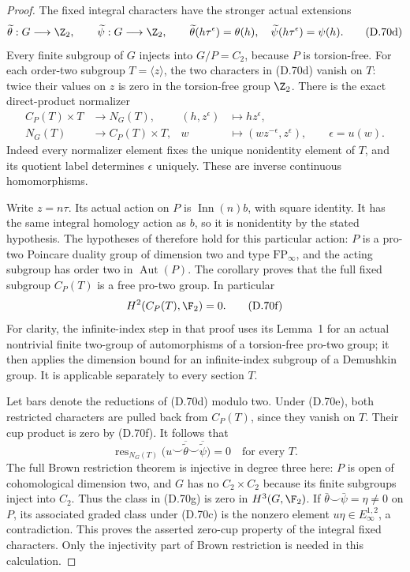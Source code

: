 \begin{proof}
The fixed integral characters have the stronger actual
extensions
\[
 \widetilde\theta:G\longrightarrow\Z_2,\qquad
 \widetilde\psi:G\longrightarrow\Z_2,\qquad
 \widetilde\theta(h\tau^\epsilon)=\theta(h),\quad
 \widetilde\psi(h\tau^\epsilon)=\psi(h).
                                                               \tag{D.70d}
\]
Every finite subgroup of $G$ injects into $G/P=C_2$,
because $P$ is torsion-free. For each order-two
subgroup $T=\langle z\rangle$, the two characters
in (D.70d) vanish on $T$: twice their values on
$z$ is zero in the torsion-free group $\Z_2$.
There is the exact direct-product normalizer
\[
 \begin{aligned}
 C_P(T)\times T&\longrightarrow N_G(T),
                    &(h,z^\epsilon)&\longmapsto hz^\epsilon,\\
 N_G(T)&\longrightarrow C_P(T)\times T,
                    &w&\longmapsto(wz^{-\epsilon},z^\epsilon),
                    \qquad \epsilon=u(w).
 \end{aligned}                                                \tag{D.70e}
\]
Indeed every normalizer element fixes the unique
nonidentity element of $T$, and its quotient label
determines $\epsilon$ uniquely.
These are inverse continuous homomorphisms.

Write $z=n\tau$. Its actual action on $P$ is
$\operatorname{Inn}(n)b$, with square identity.
It has the same integral homology action as $b$,
so it is nonidentity by the stated hypothesis.
The hypotheses of
\cite[Corollary~2 and its proof in \S2]{A-KochloukovaZalesskii2007}
therefore hold for this particular action:
$P$ is a pro-two Poincare duality group of dimension
two and type $\mathrm{FP}_\infty$, and the acting
subgroup has order two in $\operatorname{Aut}(P)$.
The corollary proves that the full fixed subgroup
$C_P(T)$ is a free pro-two group.
In particular
\[
                          H^2(C_P(T),\F_2)=0.                \tag{D.70f}
\]
For clarity, the infinite-index step in that proof
uses its Lemma~1 for an actual nontrivial finite
two-group of automorphisms of a torsion-free pro-two
group; it then applies the dimension bound for an
infinite-index subgroup of a Demushkin group.
It is applicable separately to every section $T$.

Let bars denote the reductions of (D.70d) modulo two.
Under (D.70e), both restricted characters are pulled
back from $C_P(T)$, since they vanish on $T$.
Their cup product is zero by (D.70f).
It follows that
\[
 \operatorname{res}_{N_G(T)}
           \bigl(u\smile\overline{\widetilde\theta}
                    \smile\overline{\widetilde\psi}\bigr)=0
                 \quad\text{for every }T.                  \tag{D.70g}
\]
The full Brown restriction theorem
\cite[Theorem~2]{A-KochloukovaZalesskii2007}
is injective in degree three here: $P$ is open
of cohomological dimension two, and $G$ has no
$C_2\times C_2$ because its finite subgroups
inject into $C_2$.
Thus the class in (D.70g) is zero in $H^3(G,\F_2)$.
If $\bar\theta\smile\bar\psi=\eta\ne0$ on $P$,
its associated graded class under (D.70c) is
the nonzero element $u\eta\in E_\infty^{1,2}$,
a contradiction. This proves the asserted
zero-cup property of the integral fixed characters.
Only the injectivity part of Brown restriction
is needed in this calculation.


\end{proof}
